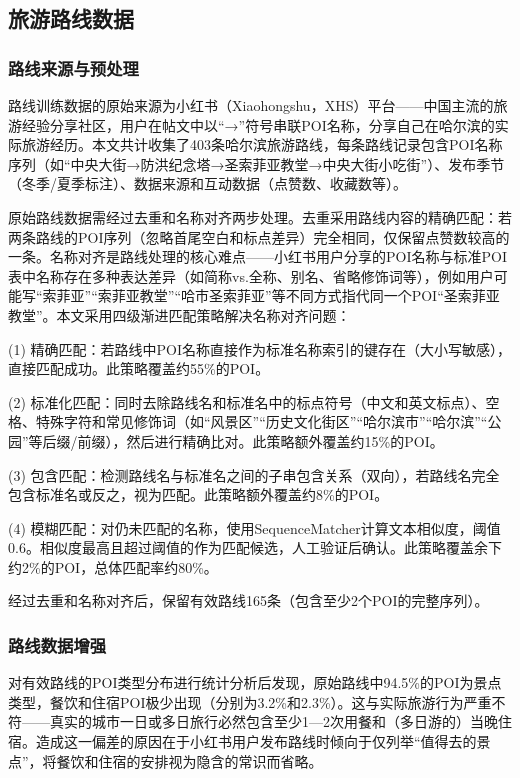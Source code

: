 \documentclass[12pt,a4paper]{ctexart}
\begin{document}
\subsection{旅游路线数据}

\subsubsection{路线来源与预处理}

路线训练数据的原始来源为小红书（Xiaohongshu，XHS）平台——中国主流的旅游经验分享社区，用户在帖文中以“→”符号串联POI名称，分享自己在哈尔滨的实际旅游经历。本文共计收集了403条哈尔滨旅游路线，每条路线记录包含POI名称序列（如“中央大街→防洪纪念塔→圣索菲亚教堂→中央大街小吃街”）、发布季节（冬季/夏季标注）、数据来源和互动数据（点赞数、收藏数等）。

原始路线数据需经过去重和名称对齐两步处理。去重采用路线内容的精确匹配：若两条路线的POI序列（忽略首尾空白和标点差异）完全相同，仅保留点赞数较高的一条。名称对齐是路线处理的核心难点——小红书用户分享的POI名称与标准POI表中名称存在多种表达差异（如简称vs.全称、别名、省略修饰词等），例如用户可能写“索菲亚”“索菲亚教堂”“哈市圣索菲亚”等不同方式指代同一个POI“圣索菲亚教堂”。本文采用四级渐进匹配策略解决名称对齐问题：

(1) 精确匹配：若路线中POI名称直接作为标准名称索引的键存在（大小写敏感），直接匹配成功。此策略覆盖约55\%的POI。

(2) 标准化匹配：同时去除路线名和标准名中的标点符号（中文和英文标点）、空格、特殊字符和常见修饰词（如“风景区”“历史文化街区”“哈尔滨市”“哈尔滨”“公园”等后缀/前缀），然后进行精确比对。此策略额外覆盖约15\%的POI。

(3) 包含匹配：检测路线名与标准名之间的子串包含关系（双向），若路线名完全包含标准名或反之，视为匹配。此策略额外覆盖约8\%的POI。

(4) 模糊匹配：对仍未匹配的名称，使用SequenceMatcher计算文本相似度，阈值0.6。相似度最高且超过阈值的作为匹配候选，人工验证后确认。此策略覆盖余下约2\%的POI，总体匹配率约80\%。

经过去重和名称对齐后，保留有效路线165条（包含至少2个POI的完整序列）。

\subsubsection{路线数据增强}

对有效路线的POI类型分布进行统计分析后发现，原始路线中94.5\%的POI为景点类型，餐饮和住宿POI极少出现（分别为3.2\%和2.3\%）。这与实际旅游行为严重不符——真实的城市一日或多日旅行必然包含至少1—2次用餐和（多日游的）当晚住宿。造成这一偏差的原因在于小红书用户发布路线时倾向于仅列举“值得去的景点”，将餐饮和住宿的安排视为隐含的常识而省略。
\end{document}
